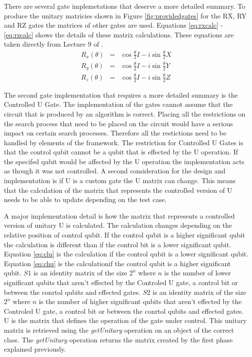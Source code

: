 There are several gate implemetations that deserve a more detailed summary.
To produce the unitary matricies shown in Figure \ref{fig:providedgates} for the RX, RY and RZ gates the matrices of other gates are used.
Equations \ref{eq:rxcalc} - \ref{eq:rzcalc} shows the details of these matrix calculations.
These equations are taken directly from Lecture 9 of \cite{QIPLect}.
\begin{eqnarray}
\label{eq:rxcalc}
 R_x(\theta)&=&\cos{\frac{\theta}{2}}I-i\sin{\frac{\theta}{2}}X \\
\label{eq:rycalc}
 R_y(\theta)&=&\cos{\frac{\theta}{2}}I-i\sin{\frac{\theta}{2}}Y \\
\label{eq:rzcalc}
 R_z(\theta)&=&\cos{\frac{\theta}{2}}I-i\sin{\frac{\theta}{2}}Z 
\end{eqnarray}

The second gate implementation that requires a more detailed summary is the Controlled U Gate.
The implementation of the gates cannot assume that the circuit that is produced by an algorithm is correct.
Placing all the restrictions on the search process that need to be placed on the circuit would have a serious impact on certain search processes.
Therefore all the restictions need to be handled by elements of the framework.
The restriction for Controlled U Gates is that the control qubit cannot be a qubit that is effected by the U operation.
If the specifed qubit would be affected by the U operation the implementation acts as though it was not controlled.
A second consideration for the design and implementation is if U is a custom gate the U matrix can change.
This means that the calculation of the matrix that represents the controlled version of U needs to be able to update depending on the test case.

A major implementation detail is how the matrix that represents a controlled version of unitary U is calculated.
The calculation changes depending on the relative position of control qubit.
If the control qubit is a higher significant qubit the calculation is different than if the control bit is a lower significant qubit.
Equation \ref{eq:clu} is the calculation if the control qubit is a lower significant qubit.
Equation \ref{eq:chu} is the calculationif the control qubit is a higher significant qubit.
$S1$ is an identity matrix of the size $2^n$ where $n$ is the number of lower significant qubits that aren't effected by the Controled U gate, a control bit or between the conrtol qubits and effected gates.
$S2$ is an identity matrix of the size $2^n$ where $n$ is the number of higher significant qubits that aren't effected by the Controled U gate, a control bit or between the conrtol qubits and effected gates.
U is the matrix that defines the operation of the gate under control.
This unitary matrix is retrieved using the \emph{getUnitary} operation on an object of the correct class.
The \emph{getUnitary} operation returns the matrix created by the first phase explained previously.

